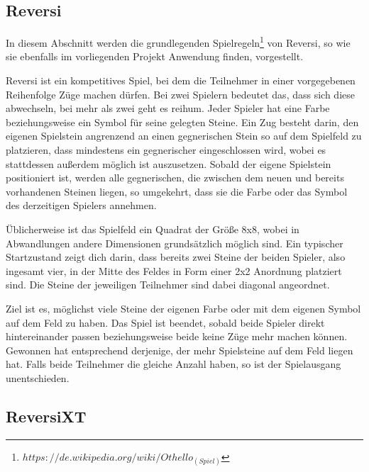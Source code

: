 \subsection{Reversi}

In diesem Abschnitt werden die grundlegenden Spielregeln\footnote{$https://de.wikipedia.org/wiki/Othello_(Spiel)$} von Reversi, so wie sie ebenfalls im vorliegenden Projekt Anwendung finden, vorgestellt.

Reversi ist ein kompetitives Spiel, bei dem die Teilnehmer in einer vorgegebenen Reihenfolge Züge machen dürfen. Bei zwei Spielern bedeutet das, dass sich diese abwechseln, bei mehr als zwei geht es reihum. Jeder Spieler hat eine Farbe beziehungsweise ein Symbol für seine gelegten Steine. Ein Zug besteht darin, den eigenen Spielstein angrenzend an einen gegnerischen Stein so auf dem Spielfeld zu platzieren, dass mindestens ein gegnerischer eingeschlossen wird, wobei es stattdessen außerdem möglich ist auszusetzen. Sobald der eigene Spielstein positioniert ist, werden alle gegnerischen, die zwischen dem neuen und bereits vorhandenen Steinen liegen, so umgekehrt, dass sie die Farbe oder das Symbol des derzeitigen Spielers annehmen.

Üblicherweise ist das Spielfeld ein Quadrat der Größe 8x8, wobei in Abwandlungen andere Dimensionen grundsätzlich möglich sind. Ein typischer Startzustand zeigt dich darin, dass bereits zwei Steine der beiden Spieler, also ingesamt vier, in der Mitte des Feldes in Form einer 2x2 Anordnung platziert sind. Die Steine der jeweiligen Teilnehmer sind dabei diagonal angeordnet.

Ziel ist es, möglichst viele Steine der eigenen Farbe oder mit dem eigenen Symbol auf dem Feld zu haben. Das Spiel ist beendet, sobald beide Spieler direkt hintereinander passen beziehungsweise beide keine Züge mehr machen können. Gewonnen hat entsprechend derjenige, der mehr Spielsteine auf dem Feld liegen hat. Falls beide Teilnehmer die gleiche Anzahl haben, so ist der Spielausgang unentschieden.

\subsection{ReversiXT}